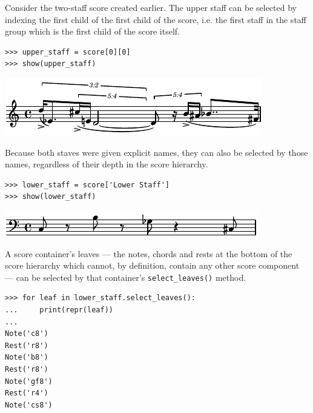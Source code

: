 \documentclass{article}
\begin{document}
Consider the two-staff score created earlier. The upper staff can be selected
by indexing the first child of the first child of the score, i.e. the first
staff in the staff group which is the first child of the score itself.

\begin{lstlisting}
>>> upper_staff = score[0][0]
>>> show(upper_staff)
\end{lstlisting}
\includegraphics{assets/lilypond-4aa1bd58533df74ce54d499ffd6dbb25.pdf}

Because both staves were given explicit names, they can also be selected by
those names, regardless of their depth in the score hierarchy.

\begin{lstlisting}
>>> lower_staff = score['Lower Staff']
>>> show(lower_staff)
\end{lstlisting}
\includegraphics{assets/lilypond-fa746e527d218a814e36af2f46d314bb.pdf}

A score container's leaves --- the notes, chords and rests at the bottom of the
score hierarchy which cannot, by definition, contain any other score component
--- can be selected by that container's \texttt{select\_leaves()} method.

\begin{lstlisting}
>>> for leaf in lower_staff.select_leaves():
...     print(repr(leaf))
...
Note('c8')
Rest('r8')
Note('b8')
Rest('r8')
Note('gf8')
Rest('r4')
Note('cs8')
\end{lstlisting}
\end{document}
